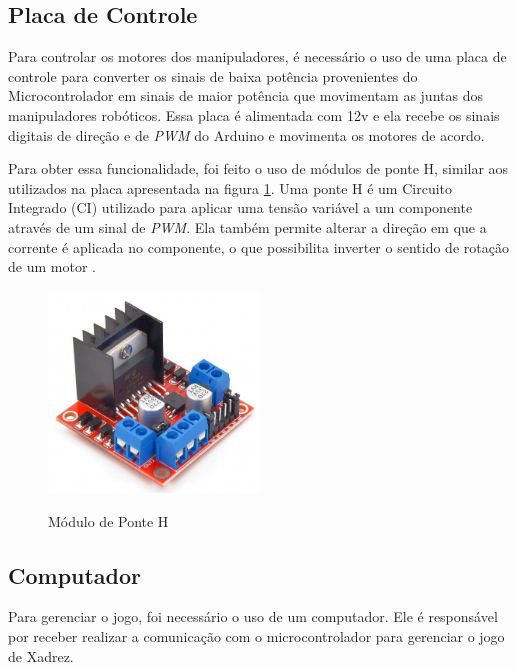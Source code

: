 \subsection[Placa de Controle]{Placa de Controle}
\label{sub:placaControle}

Para controlar os motores dos manipuladores, é necessário o uso de uma placa de controle para converter os sinais de baixa potência provenientes do Microcontrolador em sinais de maior potência que movimentam as juntas dos manipuladores robóticos.
Essa placa é alimentada com 12v e ela recebe os sinais digitais de direção e de \textit{PWM} do Arduino e movimenta os motores de acordo.

Para obter essa funcionalidade, foi feito o uso de módulos de ponte H, similar aos utilizados na placa apresentada na figura \ref{fig:ponteH}.
Uma ponte H é um Circuito Integrado (CI) utilizado para aplicar uma tensão variável a um componente através de um sinal de \textit{PWM}.
Ela também permite alterar a direção em que a corrente é aplicada no componente, o que possibilita inverter o sentido de rotação de um motor \cite{h_bridge}.


\begin{figure}[H]
    \centering
    \caption{Módulo de Ponte H}
    \includegraphics[keepaspectratio=true, width=0.5\textwidth]
    	{img/ponte-h.jpg}
    \label{fig:ponteH}
\end{figure}

\subsection[Computador]{Computador}
\label{sub:computador}

Para gerenciar o jogo, foi necessário o uso de um computador.
Ele é responsável por receber realizar a comunicação com o microcontrolador para gerenciar o jogo de Xadrez.

